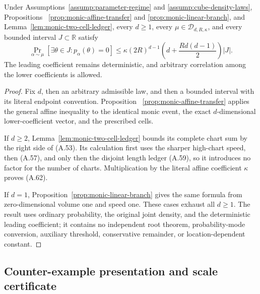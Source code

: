 \begin{proposition}
\label{prop:monic-probability}
Under Assumptions~\ref{assump:parameter-regime} and
\ref{assump:cube-density-laws}, Propositions
~\ref{prop:monic-affine-transfer} and
\ref{prop:monic-linear-branch}, and
Lemma~\ref{lem:monic-two-cell-ledger}, every $d\geq1$, every
$\mu\in\mathcal D_{d,R,\kappa}$, and every bounded interval
$J\subset\mathbb R$ satisfy
\[
\Pr_{\alpha\sim\mu}
[\exists\theta\in J:p_\alpha(\theta)=0]
\leq\kappa(2R)^{d-1}
\left(d+\frac{Rd(d-1)}2\right)|J|.
\tag{A.62}
\]
The leading coefficient remains deterministic, and arbitrary correlation
among the lower coefficients is allowed.
\end{proposition}

\begin{proof}
Fix $d$, then an arbitrary admissible law, and then a bounded interval with
its literal endpoint convention.  Proposition
~\ref{prop:monic-affine-transfer} applies the general affine inequality to
the identical monic event, the exact $d$-dimensional lower-coefficient
vector, and the prescribed cells.

If $d\geq2$, Lemma~\ref{lem:monic-two-cell-ledger} bounds its complete chart
sum by the right side of (A.53).  Its calculation first uses the sharper
high-chart speed, then (A.57), and only then the disjoint length ledger
(A.59), so it introduces no factor for the number of charts.  Multiplication
by the literal affine coefficient $\kappa$ proves (A.62).

If $d=1$, Proposition~\ref{prop:monic-linear-branch} gives the same formula
from zero-dimensional volume one and speed one.  These cases exhaust all
$d\geq1$.  The result uses ordinary probability, the original joint density,
and the deterministic leading coefficient; it contains no independent root
theorem, probability-mode conversion, auxiliary threshold, conservative
remainder, or location-dependent constant.
\end{proof}

\subsection{Counter-example presentation and scale certificate}
\label{app:counter-example}

